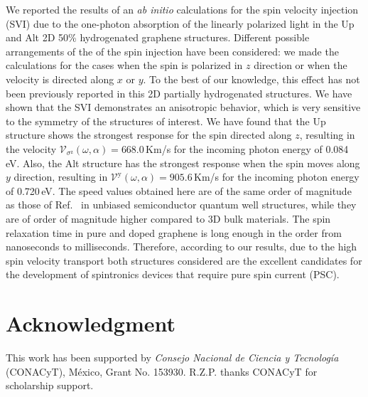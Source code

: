 \documentclass[floatfix,prb,aps,superscriptaddress,showpacs,11pt,preprint,letterpaper]{revtex4}
\begin{document}
We reported the results of an \emph{ab initio} calculations for the spin
velocity injection (SVI) due to the one-photon absorption of the linearly
polarized light in the Up and Alt 2D 50\% hydrogenated graphene structures.
Different possible arrangements of the of the spin injection have been
considered: we made the calculations for the cases when the spin is polarized
in $z$ direction or when the velocity is directed along $x$ or $y$. To the best
of our knowledge, this effect  has not been previously reported in this  2D
partially hydrogenated structures. We have shown that the  SVI demonstrates an
anisotropic behavior, which is very sensitive to the symmetry of the structures
of interest. We have found that the Up structure shows the strongest response
for the spin directed along $z$, resulting in the velocity
$\mathcal{V}_{\sigma^{\mathrm{z}}} (\omega,\alpha) = 668.0$\,Km/s for the
incoming photon energy of 0.084\,eV. Also, the Alt structure has the strongest
response when the spin moves along $y$ direction, resulting in
$\mathcal{V}^{\mathrm{y}} (\omega,\alpha) = 905.6$\,Km/s for the incoming
photon energy of 0.720\,eV. The speed values obtained here are of the same
order of magnitude as those of Ref.~ in unbiased
semiconductor quantum well structures, while they are of order of magnitude
higher compared to 3D bulk materials. The spin relaxation time in pure and
doped graphene is long enough in the order from nanoseconds to milliseconds.
\cite{wojtaszekPRB13,ertlerPRB09} Therefore, according to our results, due to
the high spin velocity transport both structures considered are the excellent
candidates for the development of spintronics devices that require pure spin
current (PSC).

\section{Acknowledgment}
This work has been supported by \emph{Consejo Nacional de Ciencia y
Tecnolog\'ia} (CONACyT), M\'exico, Grant No. 153930.
R.Z.P. thanks CONACyT for scholarship support.


\end{document}
